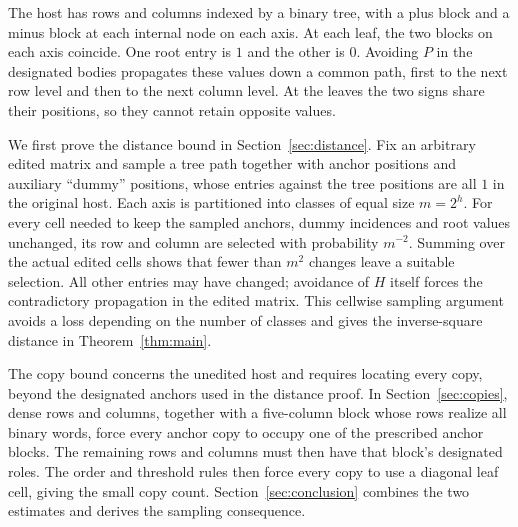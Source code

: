 The host has rows and columns indexed by a binary tree, with a plus
block and a minus block at each internal node on each axis. At each
leaf, the two blocks on each axis coincide. One root entry is $1$ and
the other is $0$. Avoiding $P$ in the designated bodies propagates
these values down a common path, first to the next row level and then
to the next column level. At the leaves the two signs share their
positions, so they cannot retain opposite values.

We first prove the distance bound in Section~\ref{sec:distance}.
Fix an arbitrary edited matrix and sample a tree path together with
anchor positions and auxiliary ``dummy'' positions, whose entries
against the tree positions are all $1$ in the original host. Each axis is
partitioned into
classes of equal size $m=2^h$. For every cell needed to keep the sampled
anchors, dummy incidences and root values unchanged, its row and column
are selected with probability $m^{-2}$. Summing over the actual edited
cells shows that fewer than $m^2$ changes leave a suitable selection.
All other entries may have changed; avoidance of $H$ itself forces the
contradictory propagation in the edited matrix. This cellwise sampling
argument avoids a loss depending on the number of classes and gives
the inverse-square distance in Theorem~\ref{thm:main}.

The copy bound concerns the unedited host and requires locating every
copy, beyond the designated anchors used in the distance proof.
In Section~\ref{sec:copies}, dense rows and columns, together with a
five-column block whose rows realize all binary words, force every
anchor copy to occupy one of the prescribed anchor blocks. The remaining rows and columns must then have
that block's designated roles. The order and threshold rules then force
every copy to use a diagonal leaf cell, giving the small copy count.
Section~\ref{sec:conclusion} combines the two estimates and derives the
sampling consequence.
